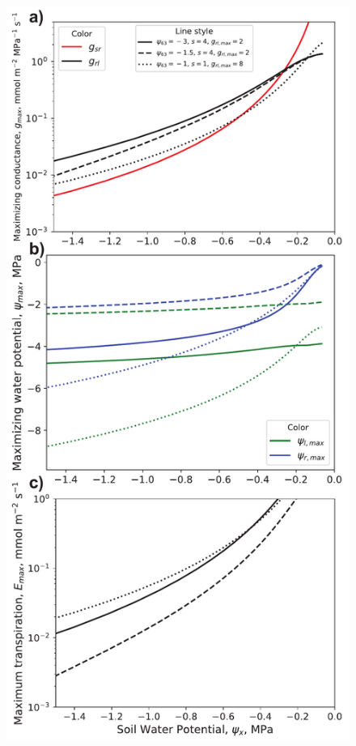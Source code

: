 \documentclass[utf8]{frontiersSCNS} %
\begin{document}
\begin{figure}[h]
    \begin{center}
        \includegraphics[scale=0.5]{g_psi_E_psix.pdf}
    \end{center}

\end{figure}
\end{document}
